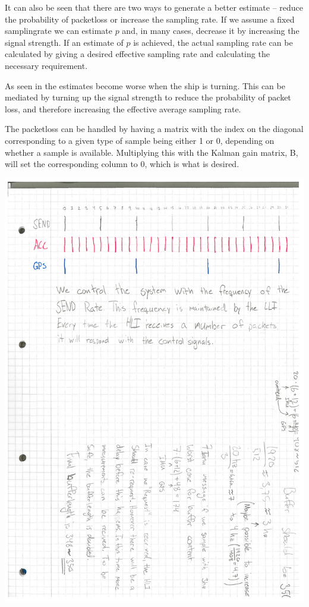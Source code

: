 It can also be seen that there are two ways to generate a better estimate -- reduce the probability of packetloss or increase the sampling rate.
If we assume a fixed samplingrate we can estimate $p$ and, in many cases, decrease it by increasing the signal strength. If an estimate of $p$ is achieved, the actual sampling rate can be calculated by giving a desired effective sampling rate and calculating the necessary requirement.

 As seen in  the estimates become worse when the ship is turning. This can be mediated by turning up the signal strength to reduce the probability of packet loss, and therefore increasing the effective average sampling rate. 

The packetloss can be handled by having a matrix with the index on the diagonal corresponding to a given type of sample being either 1 or 0, depending on whether a sample is available. Multiplying this with the Kalman gain matrix, B, will set the corresponding column to 0, which is what is desired.

\includegraphics[width = \textwidth]{simplex}
